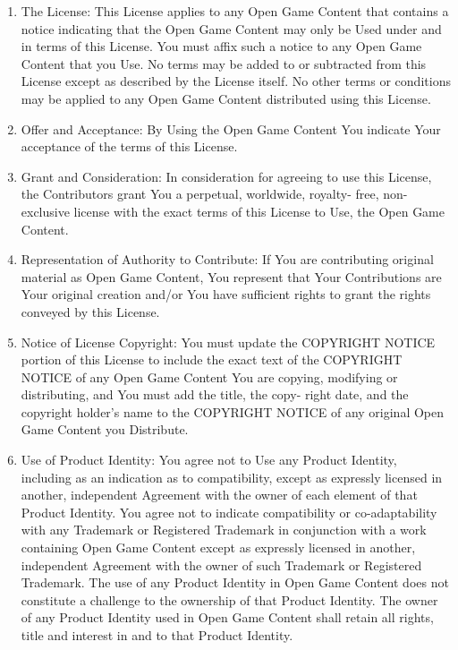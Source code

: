\documentclass{tufte-handout}
\begin{document}
\begin{fullwidth}
\begin{enumerate}
\item The License: This License applies to any Open Game Content that
  contains a notice indicating that the Open Game Content may only be
  Used under and in terms of this License. You must affix such a
  notice to any Open Game Content that you Use. No terms may be added
  to or subtracted from this License except as described by the
  License itself. No other terms or conditions may be applied to any
  Open Game Content distributed using this License.

\item Offer and Acceptance: By Using the Open Game Content You
  indicate Your acceptance of the terms of this License.

\item Grant and Consideration: In consideration for agreeing to use
  this License, the Contributors grant You a perpetual, worldwide,
  royalty- free, non-exclusive license with the exact terms of this
  License to Use, the Open Game Content.

\item Representation of Authority to Contribute: If You are
  contributing original material as Open Game Content, You represent
  that Your Contributions are Your original creation and/or You have
  sufficient rights to grant the rights conveyed by this License.

\item Notice of License Copyright: You must update the COPYRIGHT
  NOTICE portion of this License to include the exact text of the
  COPYRIGHT NOTICE of any Open Game Content You are copying, modifying
  or distributing, and You must add the title, the copy- right date,
  and the copyright holder's name to the COPYRIGHT NOTICE of any
  original Open Game Content you Distribute.

\item Use of Product Identity: You agree not to Use any Product
  Identity, including as an indication as to compatibility, except as
  expressly licensed in another, independent Agreement with the owner
  of each element of that Product Identity. You agree not to indicate
  compatibility or co-adaptability with any Trademark or Registered
  Trademark in conjunction with a work containing Open Game Content
  except as expressly licensed in another, independent Agreement with
  the owner of such Trademark or Registered Trademark. The use of any
  Product Identity in Open Game Content does not constitute a
  challenge to the ownership of that Product Identity. The owner of
  any Product Identity used in Open Game Content shall retain all
  rights, title and interest in and to that Product Identity.


\end{enumerate}
\end{fullwidth}
\end{document}
